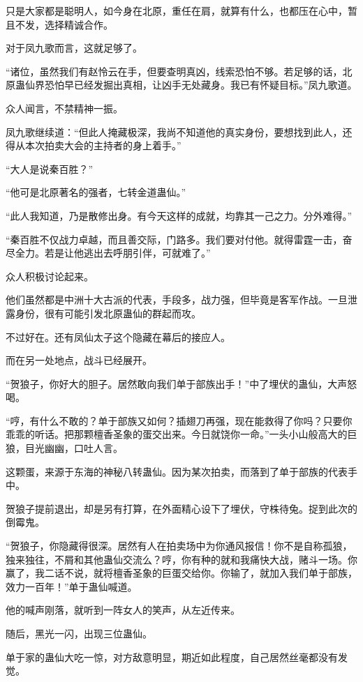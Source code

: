 \begin{this_body}
只是大家都是聪明人，如今身在北原，重任在肩，就算有什么，也都压在心中，暂且不发，选择精诚合作。

对于凤九歌而言，这就足够了。

“诸位，虽然我们有赵怜云在手，但要查明真凶，线索恐怕不够。若足够的话，北原蛊仙界恐怕早已经发掘出真相，让凶手无处藏身。我已有怀疑目标。”凤九歌道。

众人闻言，不禁精神一振。

凤九歌继续道：“但此人掩藏极深，我尚不知道他的真实身份，要想找到此人，还得从本次拍卖大会的主持者的身上着手。”

“大人是说秦百胜？”

“他可是北原著名的强者，七转金道蛊仙。”

“此人我知道，乃是散修出身。有今天这样的成就，均靠其一己之力。分外难得。”

“秦百胜不仅战力卓越，而且善交际，门路多。我们要对付他。就得雷霆一击，奋尽全力。若是让他逃出去呼朋引伴，可就难了。”

众人积极讨论起来。

他们虽然都是中洲十大古派的代表，手段多，战力强，但毕竟是客军作战。一旦泄露身份，很有可能引发北原蛊仙的群起而攻。

不过好在。还有凤仙太子这个隐藏在幕后的接应人。

而在另一处地点，战斗已经展开。

“贺狼子，你好大的胆子。居然敢向我们单于部族出手！”中了埋伏的蛊仙，大声怒喝。

“哼，有什么不敢的？单于部族又如何？插翅刀再强，现在能救得了你吗？只要你乖乖的听话。把那颗檀香圣象的蛋交出来。今日就饶你一命。”一头小山般高大的巨狼，目光幽幽，口吐人言。

这颗蛋，来源于东海的神秘八转蛊仙。因为某次拍卖，而落到了单于部族的代表手中。

贺狼子提前退出，却是另有打算，在外面精心设下了埋伏，守株待兔。捉到此次的倒霉鬼。

“贺狼子，你隐藏得很深。居然有人在拍卖场中为你通风报信！你不是自称孤狼，独来独往，不屑和其他蛊仙交流么？哼，你有种的就和我痛快大战，赌斗一场。你赢了，我二话不说，就将檀香圣象的巨蛋交给你。你输了，就加入我们单于部族，效力一百年！”单于蛊仙喊道。

他的喊声刚落，就听到一阵女人的笑声，从左近传来。

随后，黑光一闪，出现三位蛊仙。

单于家的蛊仙大吃一惊，对方敌意明显，期近如此程度，自己居然丝毫都没有发觉。


\end{this_body}
